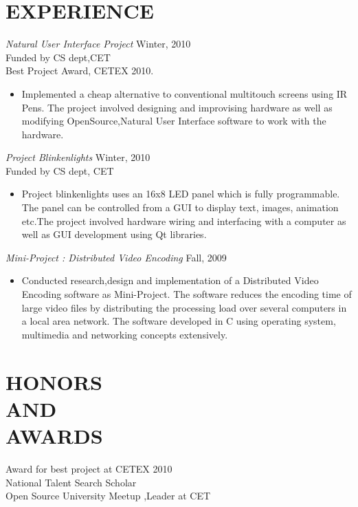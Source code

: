 \documentclass[line,margin]{res}
\begin{document}
\begin{resume}
\section{EXPERIENCE} {\sl Natural User Interface Project} \hfill Winter, 2010 \\
    Funded by CS dept,CET\\
    Best Project Award, CETEX 2010.
    \begin{itemize}  \itemsep -2pt %
    \item 
      Implemented a cheap alternative to conventional multitouch 
      screens using IR Pens. The project involved designing and 
      improvising hardware as well as modifying OpenSource,Natural 
      User Interface sof\mbox{}tware to work with the hardware. 
   \end{itemize}
 
   {\sl Project Blinkenlights} \hfill            Winter, 2010 \\
   Funded by CS dept, CET
   \begin{itemize}  \itemsep -2pt %
   \item 
     Project blinkenlights uses an 16x8 LED panel which is fully 
     programmable. The panel can be controlled from a GUI to display 
     text, images, animation etc.The project involved hardware wiring 
     and interfacing with a computer as well as GUI development using
     Qt libraries.
   \end{itemize} 
                 
   {\sl Mini-Project : Distributed Video Encoding} \hfill        Fall, 2009 \\
   \begin{itemize}
   \item Conducted research,design and implementation of a Distributed 
     Video Encoding sof\mbox{}tware as Mini-Project. The sof\mbox{}tware reduces the 
     encoding time of large video f\mbox{}iles by distributing the
     processing load over several computers in a local area network. The 
     sof\mbox{}tware developed in C using operating system, multimedia and
     networking concepts extensively.
   \end{itemize} 
 
\section{HONORS \\AND\\ AWARDS}          
    Award for best project at CETEX 2010   \\      
    National Talent Search Scholar \\
    Open Source University Meetup ,Leader at CET 
	

\end{resume}
\end{document}
